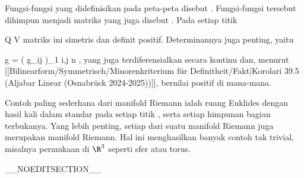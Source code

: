 Fungsi-fungsi
 yang didefinisikan pada peta-peta disebut
 {} {}
 {.} Fungsi-fungsi tersebut dihimpun menjadi matriks
 yang juga disebut  {}
 {} {.}
Pada setiap titik

\mavergleichskette
{\vergleichskette
{ Q
}
{ \in }{ V
}
{  }{
}
{    }{
}
{   }{
}
}
{}{}{}
matriks ini simetris dan definit positif. Determinannya juga penting, yaitu

\mavergleichskettedisp
{\vergleichskette
{ g
}
{ =} { \det  \left(  g_{ij}  \right)_{1 \leq i,j \leq n}
}
{ } {
}
{ } {
}
{ } {
}
}
{}{}{,}
yang juga terdiferensialkan secara kontinu dan, menurut
[[Bilinearform/Symmetrisch/Minorenkriterium für Definitheit/Fakt|Korolari 39.5 (Aljabar Linear (Osnabrück 2024-2025))]],
bernilai positif di mana-mana.

Contoh paling sederhana dari manifold Riemann ialah ruang Euklides
 dengan hasil kali dalam standar pada setiap titik
 {} {},
serta setiap himpunan bagian terbukanya. Yang lebih penting, setiap
dari suatu manifold Riemann juga merupakan manifold Riemann. Hal ini menghasilkan banyak contoh tak trivial, misalnya permukaan di $\R^3$ seperti sfer atau torus.

__NOEDITSECTION__

